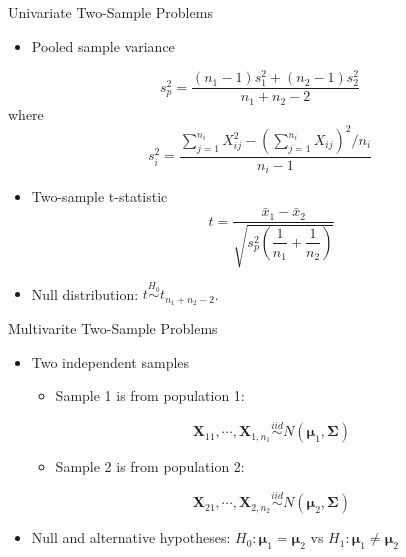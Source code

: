 \documentclass[
  ignorenonframetext,
]{beamer}
\providecommand{\tightlist}{%
  \setlength{\itemsep}{0pt}\setlength{\parskip}{0pt}}
\begin{document}
\begin{frame}{Univariate Two-Sample Problems}
\protect\hypertarget{univariate-two-sample-problems-1}{}
\begin{itemize}
\tightlist
\item
  Pooled sample variance
\end{itemize}

\[s^2_p = \dfrac{(n_1-1)s^2_1+(n_2-1)s^2_2}{n_1+n_2-2}\] where
\[s^2_i = \dfrac{\sum_{j=1}^{n_i}X^2_{ij}-(\sum_{j=1}^{n_i}X_{ij})^2/n_i}{n_i-1}\]

\begin{itemize}
\item
  Two-sample t-statistic
  \[t = \dfrac{\bar{x}_1-\bar{x}_2}{\sqrt{s^2_p(\dfrac{1}{n_1}+\dfrac{1}{n_2})}} \]
\item
  Null distribution: \(t\overset{H_0}\sim t_{n_1+n_2-2}\).
\end{itemize}
\end{frame}

\begin{frame}{Multivarite Two-Sample Problems}
\protect\hypertarget{multivarite-two-sample-problems}{}
\begin{itemize}
\item
  Two independent samples

  \begin{itemize}
  \tightlist
  \item
    Sample 1 is from population 1:
  \end{itemize}

  \[\mathbf X_{11}, \cdots,\mathbf  X_{1,n_1}\overset{iid} \sim N(\boldsymbol \mu_1, \boldsymbol \Sigma)\]

  \begin{itemize}
  \tightlist
  \item
    Sample 2 is from population 2:
  \end{itemize}

  \[\mathbf X_{21}, \cdots,\mathbf  X_{2,n_2}\overset{iid} \sim N(\boldsymbol \mu_2, \boldsymbol \Sigma)\]
\item
  Null and alternative hypotheses:
  \(H_0: \boldsymbol \mu_1=\boldsymbol \mu_2\) vs
  \(H_1: \boldsymbol \mu_1\not=\boldsymbol \mu_2\)
\end{itemize}
\end{frame}
\end{document}
